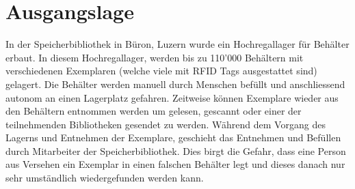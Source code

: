 \chapter{Ausgangslage}
In der Speicherbibliothek in Büron, Luzern wurde ein Hochregallager für Behälter erbaut. In diesem Hochregallager, werden bis zu 110'000 Behältern mit verschiedenen Exemplaren (welche viele mit RFID Tags ausgestattet sind) gelagert. Die Behälter werden manuell durch Menschen befüllt und anschliessend autonom an einen Lagerplatz gefahren. Zeitweise können Exemplare wieder aus den Behältern entnommen werden um gelesen, gescannt oder einer der teilnehmenden Bibliotheken gesendet zu werden. Während dem Vorgang des Lagerns und Entnehmen der Exemplare, geschieht das Entnehmen und Befüllen durch Mitarbeiter der Speicherbibliothek. Dies birgt die Gefahr, dass eine Person aus Versehen ein Exemplar in einen falschen Behälter legt und dieses danach nur sehr umständlich wiedergefunden werden kann.
